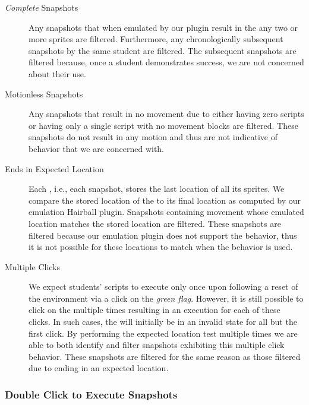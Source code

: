 \begin{description}
\item [\emph{Complete} Snapshots] Any snapshots that when emulated by our
  plugin result in the \net{}  any two or more sprites are
  filtered. Furthermore, any chronologically subsequent snapshots by the same
  student are filtered. The subsequent snapshots are filtered because, once a
  student demonstrates success, we are not concerned about their \dce{} use.
\item [Motionless Snapshots] Any snapshots that result in no movement due to
  either having zero scripts or having only a single \netclicked{} script with
  no movement blocks are filtered. These snapshots do not result in any motion
  and thus are not indicative of \dce{} behavior that we are concerned with.
\item [\net{} Ends in Expected Location] Each \sprogram{}, i.e., each snapshot,
  stores the last location of all its sprites. We compare the stored location
  of the \net{} to its final location as computed by our \net{} emulation
  Hairball plugin. Snapshots containing movement whose emulated \net{} location
  matches the  stored location are filtered. These snapshots are
  filtered because our emulation plugin does not support the \dce{} behavior,
  thus it is not possible for these locations to match when the \dce{} behavior
  is used.
\item [Multiple \net{} Clicks] We expect students' scripts to execute only once
  upon \netclicked{} following a reset of the environment via a click on the
  \emph{green flag}. However, it is still possible to click on the \net{}
  multiple times resulting in an execution for each of these clicks. In such
  cases, the \net{} will initially be in an invalid state for all but the first
  \net{} click. By performing the expected location test multiple times we are
  able to both identify and filter snapshots exhibiting this multiple \net{}
  click behavior. These snapshots are filtered for the same reason as those
  filtered due to ending in an expected location.
\end{description}


\subsubsection{Double Click to Execute Snapshots}

